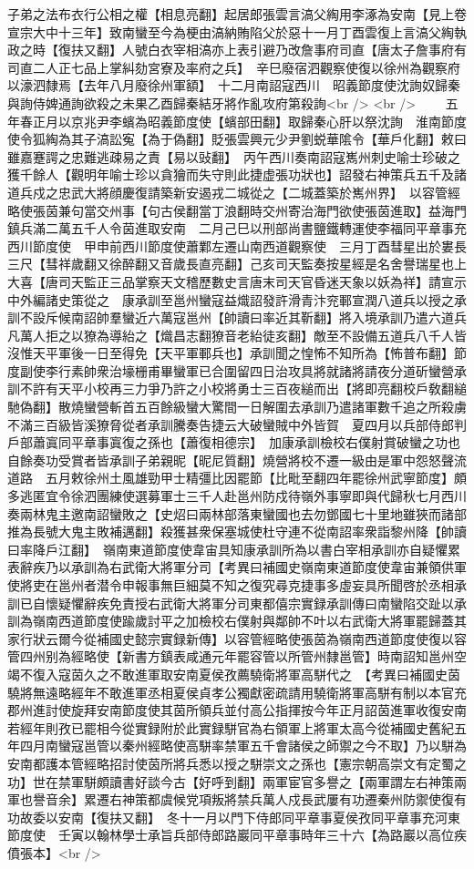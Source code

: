 子弟之法布衣行公相之權【相息亮翻】起居郎張雲言滈父綯用李涿為安南【見上卷宣宗大中十三年】致南蠻至今為梗由滈納賄陷父於惡十一月丁酉雲復上言滈父綯執政之時【復扶又翻】人號白衣宰相滈亦上表引避乃改詹事府司直【唐太子詹事府有司直二人正七品上掌糾劾宮寮及率府之兵】　辛巳廢宿泗觀察使復以徐州為觀察府以濠泗隸焉【去年八月廢徐州軍額】　十二月南詔寇西川　昭義節度使沈詢奴歸秦與詢侍婢通詢欲殺之未果乙酉歸秦結牙將作亂攻府第殺詢<br />
<br />
　　五年春正月以京兆尹李蠙為昭義節度使【蠙部田翻】取歸秦心肝以祭沈詢　淮南節度使令狐綯為其子滈訟寃【為于偽翻】貶張雲興元少尹劉蜕華隂令【華戶化翻】敕曰雖嘉蹇諤之忠難逃疎易之責【易以䜴翻】　丙午西川奏南詔寇嶲州刺史喻士珍破之獲千餘人【觀明年喻士珍以貪獪而失守則此捷虚張功狀也】詔發右神策兵五千及諸道兵戍之忠武大將顔慶復請築新安遏戎二城從之【二城蓋築於嶲州界】　以容管經略使張茵兼句當交州事【句古侯翻當丁浪翻時交州寄治海門欲使張茵進取】益海門鎮兵滿二萬五千人令茵進取安南　二月己巳以刑部尚書鹽鐵轉運使李福同平章事充西川節度使　甲申前西川節度使蕭鄴左遷山南西道觀察使　三月丁酉彗星出於婁長三尺【彗祥歲翻又徐醉翻又音歲長直亮翻】己亥司天監奏按星經是名舍譽瑞星也上大喜【唐司天監正三品掌察天文稽歷數史言唐末司天官昏迷天象以妖為祥】請宣示中外編諸史策從之　康承訓至邕州蠻寇益熾詔發許滑青汴兖鄆宣潤八道兵以授之承訓不設斥候南詔帥羣蠻近六萬寇邕州【帥讀曰率近其靳翻】將入境承訓乃遣六道兵凡萬人拒之以獠為導紿之【熾昌志翻獠音老紿徒亥翻】敵至不設備五道兵八千人皆沒惟天平軍後一日至得免【天平軍鄆兵也】承訓聞之惶怖不知所為【怖普布翻】節度副使李行素帥衆治壕栅甫畢蠻軍已合圍留四日治攻具將就諸將請夜分道斫蠻營承訓不許有天平小校再三力爭乃許之小校將勇士三百夜縋而出【將即亮翻校戶敎翻縋馳偽翻】散燒蠻營斬首五百餘級蠻大驚間一日解圍去承訓乃遣諸軍數千追之所殺虜不滿三百級皆溪獠脅從者承訓騰奏告捷云大破蠻賊中外皆賀　夏四月以兵部侍郎判戶部蕭寘同平章事寘復之孫也【蕭復相德宗】　加康承訓檢校右僕射賞破蠻之功也自餘奏功受賞者皆承訓子弟親昵【昵尼質翻】燒營將校不遷一級由是軍中怨怒聲流道路　五月敕徐州土風雄勁甲士精彊比因罷節【比毗至翻四年罷徐州武寧節度】頗多逃匿宜令徐泗團練使選募軍士三千人赴邕州防戍待嶺外事寧即與代歸秋七月西川奏兩林鬼主邀南詔蠻敗之【史炤曰兩林部落東蠻國也去勿鄧國七十里地雖狹而諸部推為長號大鬼主敗補邁翻】殺獲甚衆保塞城使杜守連不從南詔率衆詣黎州降【帥讀曰率降戶江翻】　嶺南東道節度使韋宙具知康承訓所為以書白宰相承訓亦自疑懼累表辭疾乃以承訓為右武衛大將軍分司【考異曰補國史嶺南東道節度使韋宙兼領供軍使將吏在邕州者潜令申報事無巨細莫不知之復究尋克捷事多虛妄具所聞啓於丞相承訓已自懷疑懼辭疾免責授右武衛大將軍分司東都僖宗實録承訓傳曰南蠻陷交趾以承訓為嶺南西道節度使踰歲討平之加檢校右僕射與鄰帥不叶以右武衛大將軍罷歸蓋其家行狀云爾今從補國史懿宗實録新傳】以容管經略使張茵為嶺南西道節度使復以容管四州别為經略使【新書方鎮表咸通元年罷容管以所管州隸邕管】時南詔知邕州空竭不復入寇茵久之不敢進軍取安南夏侯孜薦驍衛將軍高駢代之　【考異曰補國史茵驍將無遠略經年不敢進軍丞相夏侯貞孝公獨獻密疏請用驍衛將軍高駢有制以本官充郡州進討使旋拜安南節度使其茵所領兵並付高公指揮按今年正月詔茵進軍收復安南若經年則孜已罷相今從實録附於此實録駢官為右領軍上將軍太高今從補國史舊紀五年四月南蠻寇邕管以秦州經略使高駢率禁軍五千會諸侯之師禦之今不取】乃以駢為安南都護本管經略招討使茵所將兵悉以授之駢崇文之孫也【憲宗朝高崇文有定蜀之功】世在禁軍駢頗讀書好談今古【好呼到翻】兩軍宦官多譽之【兩軍謂左右神策兩軍也譽音余】累遷右神策都虞候党項叛將禁兵萬人戍長武屢有功遷秦州防禦使復有功故委以安南【復扶又翻】　冬十一月以門下侍郎同平章事夏侯孜同平章事充河東節度使　壬寅以翰林學士承旨兵部侍郎路巖同平章事時年三十六【為路巖以高位疾僨張本】<br />
